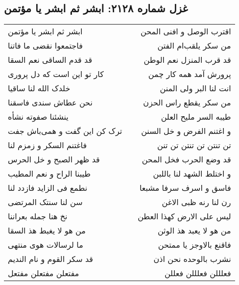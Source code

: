 \begin{center}
\section*{غزل شماره ۲۱۲۸: ابشر ثم ابشر یا مؤتمن}
\label{sec:2128}
\begin{longtable}{l p{0.5cm} r}
ابشر ثم ابشر یا مؤتمن
&&
اقترب الوصل و افنی المحن
\\
فاجتمعوا نقضی ما فاتنا
&&
من سکر یلقب‌ام الفتن
\\
قد قدم الساقی نعم السقا
&&
قد قرب المنزل نعم الوطن
\\
کار تو این است که دل پروری
&&
پرورش آمد همه کار چمن
\\
خلدک الله لنا ساقیا
&&
انت لنا البر ولی المنن
\\
نحن عطاش سندی فاسقنا
&&
من سکر یقطع راس الحزن
\\
ینشئنا صفوته نشأه
&&
طیبه السر ملیح العلن
\\
ترک کن این گفت و همی‌باش جفت
&&
و اغتنم الفرض و خل السنن
\\
فاغتنم السکر و زمزم لنا
&&
تن تنتن تن تنتن تن تنن
\\
قد ظهر الصبح و خل الحرس
&&
قد وضع الحرب فخل المحن
\\
طیبنا الراح و نعم المطیب
&&
و اختلط الشهد لنا باللبن
\\
نطمع فی الزاید فازدد لنا
&&
فاسق و اسرف سرفا مشبعا
\\
سن لنا سنتک المرتضی
&&
رن لنا رنه ظبی الاغن
\\
نخ هنا جمله بعراننا
&&
لیس علی الارض کهذا العطن
\\
من هو لا یغبط هذ السقا
&&
من هو لا یعبد هذ الوثن
\\
ما لرسالات هوی منتهی
&&
فاقنع بالاوجز یا ممتحن
\\
قد سکر القوم و نام الندیم
&&
نشرب بالوحده نحن اذن
\\
مفتعلن مفتعلن مفتعل
&&
فعلللن فعلللن فعللن
\\
\end{longtable}
\end{center}
